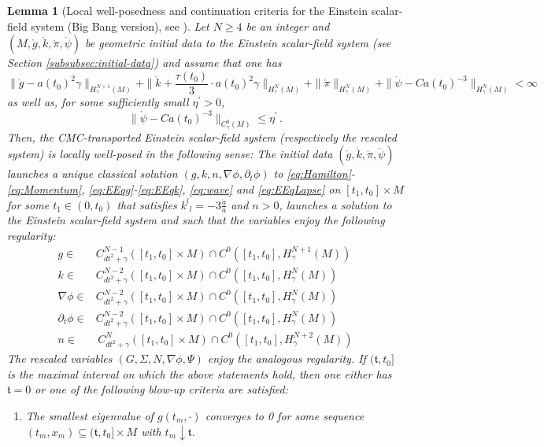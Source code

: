 \documentclass[11pt,leqno,textwidth=10cm]{amsart}
\numberwithin{equation}{section}
\theoremstyle{definition}
\theoremstyle{plain}
\newtheorem{lemma}[definition]{Lemma}
\newcommand{\1}{\mathbbm{1}}
\newcommand{\del}{\partial}
\newcommand{\change}[1]{\color{black}#1\color{black}}
\begin{document}
\begin{lemma}[Local well-posedness and continuation criteria for the Einstein scalar-field system (Big Bang version), see {\cite[Theorem 14.1]{Rodnianski2014}}]\label{lem:lwp}
Let $N\geq 4$ be an integer and $(M,\mathring{g},\mathring{k},\mathring{\pi},\mathring{\psi})$ be geometric initial data to the Einstein scalar-field system (see \change{Section \ref{subsubsec:initial-data}}) and assume that one has
\[\|\mathring{g}-a(t_0)^2\gamma\|_{H^{N+1}_\gamma(M)}+\|\mathring{k}+\frac{\tau(t_0)}3\cdot a(t_0)^2\gamma\|_{H^N_\gamma(M)}+\|\mathring{\pi}\|_{H^{N}_{\gamma}(M)}+\|\mathring{\psi}-Ca(t_0)^{-3}\|_{H^N_\gamma(M)}<\infty\,\]
as well as, for some sufficiently small $\eta^\prime>0$,
\[\|\mathring{\psi}-Ca(t_0)^{-3}\|_{C^0_\gamma(M)}\leq\eta^\prime\,.\]
Then, the CMC-transported Einstein scalar-field system (respectively the rescaled system) is locally well-posed in the following sense: The initial data $(\mathring{g},\mathring{k},\mathring{\pi},\mathring{\psi})$ launches a unique classical solution $(g,k,n,\nabla\phi,\del_t\phi)$ to \eqref{eq:Hamilton}-\eqref{eq:Momentum}, \eqref{eq:EEqg}-\eqref{eq:EEqk}, \eqref{eq:wave} and \eqref{eq:EEqLapse} on $[t_1,t_0]\times M$ for some $t_1\in(0,t_0)$ that satisfies ${k^l}_l=-3\frac{\dot{a}}a$ and $n>0$, launches a solution to the Einstein scalar-field system and such that the variables enjoy the following regularity:
\begin{align*}
g\in&C^{N-1}_{dt^2+\gamma}([t_1,t_0]\times M)\cap C^0([t_1,t_0],H_{\gamma}^{N+1}(M))\\
k\in&C^{N-2}_{dt^2+\gamma}([t_1,t_0]\times M)\cap C^0([t_1,t_0],H_{\gamma}^{N}(M))\\
\nabla\phi\in&C^{N-2}_{dt^2+\gamma}([t_1,t_0]\times M)\cap C^0([t_1,t_0],H_{\gamma}^{N}(M))\\
\del_t\phi\in&C^{N-2}_{dt^2+\gamma}([t_1,t_0]\times M)\cap C^0([t_1,t_0],H_{\gamma}^{N}(M))\\
n\in&\,C^N_{dt^2+\gamma}([t_1,t_0]\times M)\cap C^0([t_1,t_0],H_{\gamma}^{N+2}(M))
\end{align*}
The rescaled variables $(G,\Sigma,N,\nabla\phi,\Psi)$ enjoy the analogous regularity. If $(\mathfrak{t},t_0]$ is the maximal interval on which the above statements hold, then one either has $\mathfrak{t}=0$ or one of the following blow-up criteria are satisfied:
\begin{enumerate}
\item The smallest eigenvalue of $g(t_m,\cdot)$ converges to 0 for some sequence $(t_m,x_m)\subseteq (\mathfrak{t},t_0]\times M$ with $t_m\downarrow \mathfrak{t}$.

\end{enumerate}
\end{lemma}
\end{document}
